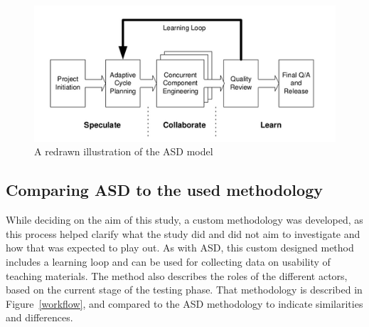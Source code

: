 \begin{figure}
\hspace*{-1cm}
\centering
\includegraphics{figure/asd.png}
\caption{A redrawn illustration of the ASD model} %
\label{asd}
\end{figure}


\subsection{Comparing ASD to the used methodology}
While deciding on the aim of this study, a custom methodology was developed, as this process helped clarify what the study did and did not aim to investigate and how that was expected to play out. As with ASD, this custom designed method includes a learning loop and can be used for collecting data on usability of teaching materials. The method also describes the roles of the different actors, based on the current stage of the testing phase. That methodology is described in Figure~\ref{workflow}, and compared to the ASD methodology to indicate similarities and differences.

